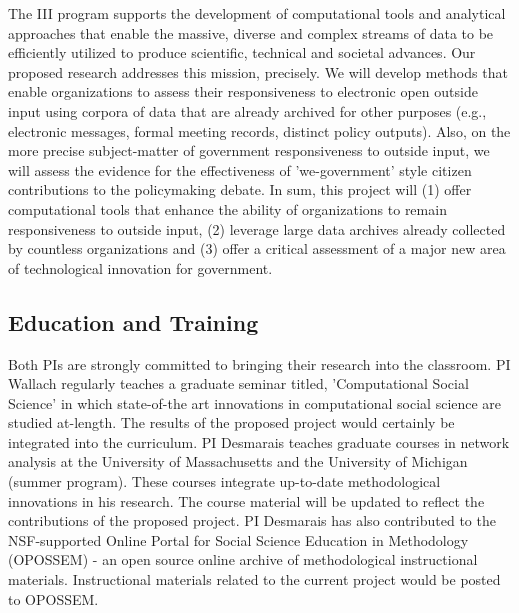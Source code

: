 The III program supports the development of computational tools and analytical approaches that enable the massive, diverse and complex streams of data to be efficiently utilized to produce scientific, technical and societal advances. Our proposed research addresses this mission, precisely. We will develop methods that enable organizations to assess their responsiveness to electronic open outside input using corpora of data that are already archived for other purposes (e.g., electronic messages, formal meeting records, distinct policy outputs). Also, on the more precise subject-matter of government responsiveness to outside input, we will assess the evidence for the effectiveness of 'we-government' style citizen contributions to the policymaking debate. In sum, this project will (1) offer computational tools that enhance the ability of organizations to remain responsiveness to outside input, (2) leverage large data archives already collected by countless organizations and (3) offer a critical assessment of a major new area of technological innovation for government.

\subsection{Education and Training}

Both PIs are strongly committed to bringing their research into the classroom. PI Wallach regularly teaches a graduate seminar titled, 'Computational Social Science' in which state-of-the art innovations in computational social science are studied at-length. The results of the proposed project would certainly be integrated into the curriculum. PI Desmarais teaches graduate courses in network analysis at the University of Massachusetts and the University of Michigan (summer program). These courses integrate up-to-date methodological innovations in his research. The course material will be updated to reflect the contributions of the proposed project. PI Desmarais has also contributed to the NSF-supported Online Portal for Social Science Education in Methodology (OPOSSEM) - an open source online archive of methodological instructional materials. Instructional materials related to the current project would be posted to OPOSSEM.

